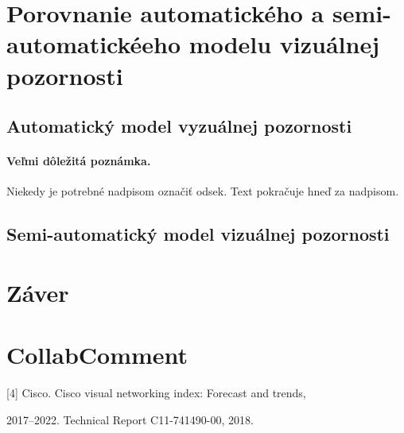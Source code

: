 \documentclass[10pt,twoside,slovak,a4paper]{article}
\begin{document}
\section{Porovnanie automatického a semi-automatickéeho modelu vizuálnej pozornosti} \label{porovnanie}
\subsection{Automatický model vyzuálnej pozornosti} \label{auto}
\paragraph{Veľmi dôležitá poznámka.}
Niekedy je potrebné nadpisom označiť odsek. Text pokračuje hneď za nadpisom.
\subsection{Semi-automatický model vizuálnej pozornosti} \label{semi-auto}
\section{Záver} \label{zaver} %
\section{CollabComment} \label{comment}

[4] Cisco. Cisco visual networking index: Forecast and trends, 

2017–2022. Technical Report C11-741490-00, 2018.
\end{document}
